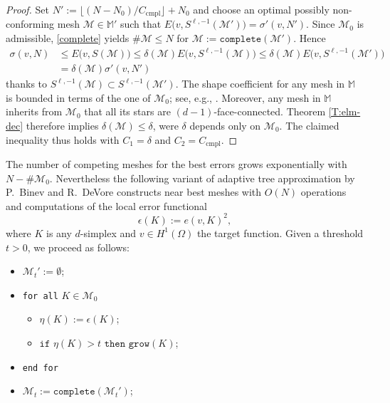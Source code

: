 \documentclass[a4paper]{amsart}
\numberwithin{equation}{section}
\theoremstyle{plain}
\theoremstyle{definition}
\begin{document}
\begin{proof}
Set $N'{:=}\lfloor (N-N_0)/{{C_\text{cmpl}}} \rfloor + N_0$ and choose an optimal 
possibly non-conforming mesh ${\mathcal{M}}\in{\mathbb{M}}'$ such that 
$E\big( v,{S}^{{\ell},-1}({\mathcal{M}}') \big) = \sigma'(v,N')$.  Since 
${\mathcal{M}}_0$ is admissible, \eqref{complete} yields $\#{\mathcal{M}}\leq N$ for
${\mathcal{M}}{:=}\texttt{complete}({\mathcal{M}}')$.  Hence
\begin{align*}
 \sigma(v,N)
 &\leq
 E\big( v, {S}({\mathcal{M}}) \big)
 \leq
 {\delta}({\mathcal{M}}) E\big( v, {S}^{{\ell},-1}({\mathcal{M}}) \big)
 \leq
 {\delta}({\mathcal{M}}) E\big( v, {S}^{{\ell},-1}({\mathcal{M}}') \big)
\\
 &=
 {\delta}({\mathcal{M}}) \sigma'(v,N')
\end{align*}
thanks to ${S}^{{\ell},-1}({\mathcal{M}})\subset{S}^{{\ell},-1}({\mathcal{M}}')$.  
The shape coefficient for any mesh in ${\mathbb{M}}$ is bounded in terms of the one 
of ${\mathcal{M}}_0$; see, e.g., \cite[Lemma 4.1]{Nochetto.Siebert.Veeser:09}.   
Moreover, any mesh in ${\mathbb{M}}$ inherits from ${\mathcal{M}}_0$ that all its stars are 
$(d-1)$-face-connected.  Theorem \ref{T:elm-dec} therefore implies 
${\delta}({\mathcal{M}})\leq{\delta}$, were ${\delta}$ depends only on ${\mathcal{M}}_0$.  The 
claimed inequality thus holds with $C_1={\delta}$ and $C_2={{C_\text{cmpl}}}$.
\end{proof}

The number of competing meshes for the best errors grows exponentially with 
$N-\#{\mathcal{M}}_0$.  Nevertheless the following variant of adaptive tree 
approximation by P.~Binev and R.~DeVore \cite{Binev.DeVore:04} constructs near 
best meshes with $O(N)$ operations and computations of the local error 
functional
\[
 {\epsilon}({K}){:=} e(v,{K})^2,
\]
where ${K}$ is any $d$-simplex and $v\in{H^{1}}(\Omega)$ the target function. 
Given a threshold $t>0$, we proceed as follows:

\smallskip\noindent
\begin{itemize}
 \item[] ${\mathcal{M}}_t'{:=}\emptyset$;
 \item[] \texttt{for all} ${K}\in{\mathcal{M}}_0$
 \begin{itemize}
  \item[] $\eta({K}) {:=} {\epsilon}({K})$;
  \item[] $\texttt{if } \eta({K})>t \texttt{ then grow}({K})$;
 \end{itemize}
 \item[] \texttt{end for}
 \item[] ${\mathcal{M}}_t {:=} \texttt{complete}({\mathcal{M}}_t')$;
\end{itemize}
\end{document}
